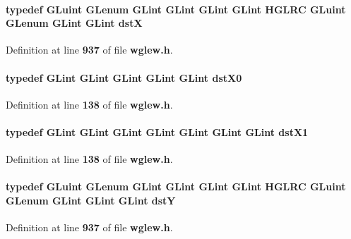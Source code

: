 \paragraph[{dstX}]{\setlength{\rightskip}{0pt plus 5cm}typedef {\bf G\+Luint} {\bf G\+Lenum} {\bf G\+Lint} {\bf G\+Lint} {\bf G\+Lint} {\bf G\+Lint} {\bf H\+G\+L\+RC} {\bf G\+Luint} {\bf G\+Lenum} {\bf G\+Lint} {\bf G\+Lint} {\bf dstX}}\label{wglew_8h_adb484de12b5207a4a52aaa9d4f4732d4}


Definition at line {\bf 937} of file {\bf wglew.\+h}.

\paragraph[{dst\+X0}]{\setlength{\rightskip}{0pt plus 5cm}typedef {\bf G\+Lint} {\bf G\+Lint} {\bf G\+Lint} {\bf G\+Lint} {\bf G\+Lint} {\bf dst\+X0}}\label{wglew_8h_a9d9af538c704fe1703a0c8224e498b38}


Definition at line {\bf 138} of file {\bf wglew.\+h}.

\paragraph[{dst\+X1}]{\setlength{\rightskip}{0pt plus 5cm}typedef {\bf G\+Lint} {\bf G\+Lint} {\bf G\+Lint} {\bf G\+Lint} {\bf G\+Lint} {\bf G\+Lint} {\bf G\+Lint} {\bf dst\+X1}}\label{wglew_8h_a8d0a8a3fce3125ccf9087a10a80203b5}


Definition at line {\bf 138} of file {\bf wglew.\+h}.

\paragraph[{dstY}]{\setlength{\rightskip}{0pt plus 5cm}typedef {\bf G\+Luint} {\bf G\+Lenum} {\bf G\+Lint} {\bf G\+Lint} {\bf G\+Lint} {\bf G\+Lint} {\bf H\+G\+L\+RC} {\bf G\+Luint} {\bf G\+Lenum} {\bf G\+Lint} {\bf G\+Lint} {\bf G\+Lint} {\bf dstY}}\label{wglew_8h_a63075223069f3ccf46d559f926d65919}


Definition at line {\bf 937} of file {\bf wglew.\+h}.

